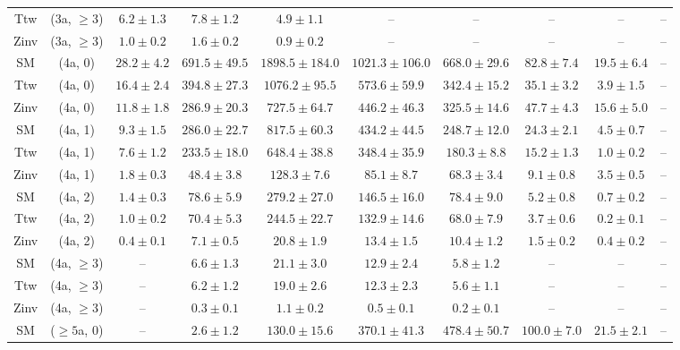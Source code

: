 \begin{table}[h!]
{\begin{tabular}{cccccccccc}
	Ttw & (3a, $\ge3$) & $6.2\pm 1.3$ & $7.8\pm 1.2$ & $4.9\pm 1.1$ & -- & -- & -- & -- & -- \\[0.5ex] 
	Zinv & (3a, $\ge3$) & $1.0\pm 0.2$ & $1.6\pm 0.2$ & $0.9\pm 0.2$ & -- & -- & -- & -- & -- \\[0.5ex] 
	SM & (4a, 0) & $28.2\pm 4.2$ & $691.5\pm 49.5$ & $1898.5\pm 184.0$ & $1021.3\pm 106.0$ & $668.0\pm 29.6$ & $82.8\pm 7.4$ & $19.5\pm 6.4$ & -- \\[0.5ex] 
	Ttw & (4a, 0) & $16.4\pm 2.4$ & $394.8\pm 27.3$ & $1076.2\pm 95.5$ & $573.6\pm 59.9$ & $342.4\pm 15.2$ & $35.1\pm 3.2$ & $3.9\pm 1.5$ & -- \\[0.5ex] 
	Zinv & (4a, 0) & $11.8\pm 1.8$ & $286.9\pm 20.3$ & $727.5\pm 64.7$ & $446.2\pm 46.3$ & $325.5\pm 14.6$ & $47.7\pm 4.3$ & $15.6\pm 5.0$ & -- \\[0.5ex] 
	SM & (4a, 1) & $9.3\pm 1.5$ & $286.0\pm 22.7$ & $817.5\pm 60.3$ & $434.2\pm 44.5$ & $248.7\pm 12.0$ & $24.3\pm 2.1$ & $4.5\pm 0.7$ & -- \\[0.5ex] 
	Ttw & (4a, 1) & $7.6\pm 1.2$ & $233.5\pm 18.0$ & $648.4\pm 38.8$ & $348.4\pm 35.9$ & $180.3\pm 8.8$ & $15.2\pm 1.3$ & $1.0\pm 0.2$ & -- \\[0.5ex] 
	Zinv & (4a, 1) & $1.8\pm 0.3$ & $48.4\pm 3.8$ & $128.3\pm 7.6$ & $85.1\pm 8.7$ & $68.3\pm 3.4$ & $9.1\pm 0.8$ & $3.5\pm 0.5$ & -- \\[0.5ex] 
	SM & (4a, 2) & $1.4\pm 0.3$ & $78.6\pm 5.9$ & $279.2\pm 27.0$ & $146.5\pm 16.0$ & $78.4\pm 9.0$ & $5.2\pm 0.8$ & $0.7\pm 0.2$ & -- \\[0.5ex] 
	Ttw & (4a, 2) & $1.0\pm 0.2$ & $70.4\pm 5.3$ & $244.5\pm 22.7$ & $132.9\pm 14.6$ & $68.0\pm 7.9$ & $3.7\pm 0.6$ & $0.2\pm 0.1$ & -- \\[0.5ex] 
	Zinv & (4a, 2) & $0.4\pm 0.1$ & $7.1\pm 0.5$ & $20.8\pm 1.9$ & $13.4\pm 1.5$ & $10.4\pm 1.2$ & $1.5\pm 0.2$ & $0.4\pm 0.2$ & -- \\[0.5ex] 
	SM & (4a, $\ge3$) & -- & $6.6\pm 1.3$ & $21.1\pm 3.0$ & $12.9\pm 2.4$ & $5.8\pm 1.2$ & -- & -- & -- \\[0.5ex] 
	Ttw & (4a, $\ge3$) & -- & $6.2\pm 1.2$ & $19.0\pm 2.6$ & $12.3\pm 2.3$ & $5.6\pm 1.1$ & -- & -- & -- \\[0.5ex] 
	Zinv & (4a, $\ge3$) & -- & $0.3\pm 0.1$ & $1.1\pm 0.2$ & $0.5\pm 0.1$ & $0.2\pm 0.1$ & -- & -- & -- \\[0.5ex] 
	SM & ($\ge5$a, 0) & -- & $2.6\pm 1.2$ & $130.0\pm 15.6$ & $370.1\pm 41.3$ & $478.4\pm 50.7$ & $100.0\pm 7.0$ & $21.5\pm 2.1$ & -- \\[0.5ex] 

\end{tabular}}
\end{table}
